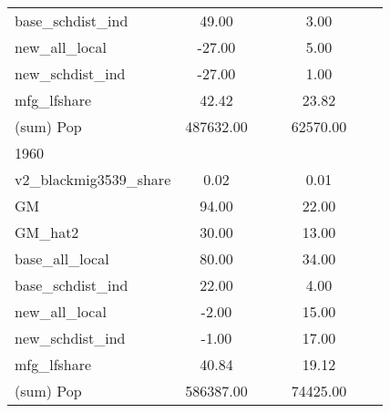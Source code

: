 \begin{table}[htbp]
\begin{tabular}{l*{2}{ccc}}
base\_schdist\_ind    &       49.00&            &            &        3.00&            &            \\
new\_all\_local       &      -27.00&            &            &        5.00&            &            \\
new\_schdist\_ind     &      -27.00&            &            &        1.00&            &            \\
mfg\_lfshare         &       42.42&            &            &       23.82&            &            \\
(sum) Pop           &   487632.00&            &            &    62570.00&            &            \\
\midrule
1960                &            &            &            &            &            &            \\
v2\_blackmig3539\_share&        0.02&            &            &        0.01&            &            \\
GM                  &       94.00&            &            &       22.00&            &            \\
GM\_hat2             &       30.00&            &            &       13.00&            &            \\
base\_all\_local      &       80.00&            &            &       34.00&            &            \\
base\_schdist\_ind    &       22.00&            &            &        4.00&            &            \\
new\_all\_local       &       -2.00&            &            &       15.00&            &            \\
new\_schdist\_ind     &       -1.00&            &            &       17.00&            &            \\
mfg\_lfshare         &       40.84&            &            &       19.12&            &            \\
(sum) Pop           &   586387.00&            &            &    74425.00&            &            \\
\bottomrule
\end{tabular}
\end{table}
